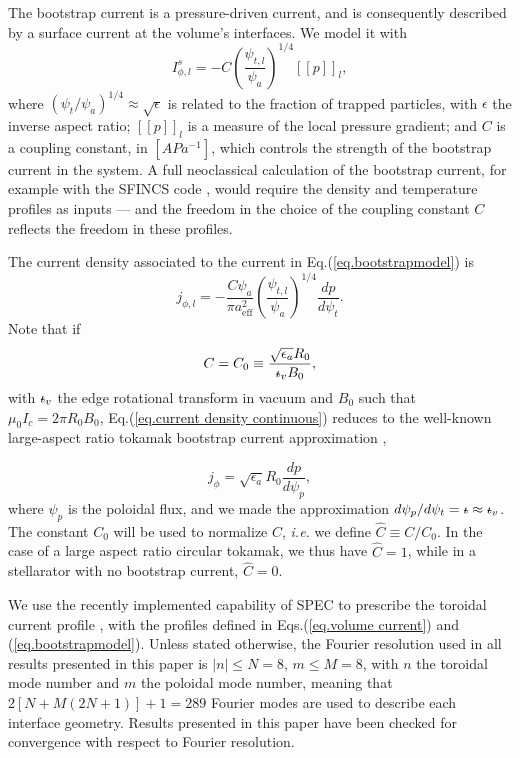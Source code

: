 \documentclass[my_thesis.tex]{subfiles}
\begin{document}
The bootstrap current is a pressure-driven current, and is consequently described by a surface current at the volume's interfaces. We model it with
\begin{equation}
	I^s_{\phi,l} = -C \left(\frac{\psi_{t,l}}{\psi_a}\right)^{1/4} \left[\left[p\right]\right]_l, \label{eq.bootstrapmodel}
\end{equation}
where $(\psi_t / \psi_a)^{1/4}\approx\sqrt{\epsilon}$ is related to the fraction of trapped particles, with $\epsilon$ the inverse aspect ratio; $[[p]]_l$ is a measure of the local pressure gradient; and $C$ is a coupling constant, in $[APa^{-1}]$, which controls the strength of the bootstrap current in the system. 
A full neoclassical calculation of the bootstrap current, for example with the SFINCS code \citep{landremanComparisonParticleTrajectories2014}, would require the density and temperature profiles as inputs --- and the freedom in the choice of the coupling constant $C$ reflects the freedom in these profiles. 

	

The current density associated to the current in Eq.(\ref{eq.bootstrapmodel}) is
\begin{equation}
	j_{\phi,l} = -\frac{C\psi_a}{\pi a_{\text{eff}}^2}\left(\frac{\psi_{t,l}}{\psi_a}\right)^{1/4}\frac{dp}{d\psi_t}. \label{eq.current density continuous}
\end{equation}	
Note that if 
\begin{equation}
	C = C_0 \equiv \frac{\sqrt{\epsilon_a}R_0}{\text{$\iota\!\!$-}_v B_0}, \label{eq. def C0}
\end{equation}
with $\text{$\iota\!\!$-}_v$ the edge rotational transform in vacuum and $B_0$ such that $\mu_0I_c= 2\pi R_0 B_0$, Eq.(\ref{eq.current density continuous}) reduces to the well-known large-aspect ratio tokamak bootstrap current approximation \citep{helanderCollisionalTransportMagnetized2002},
	
\begin{equation}
	j_{\phi} = \sqrt{\epsilon_a}R_0\frac{d p}{d\psi_p},
\end{equation}
where $\psi_p$ is the poloidal flux, and we made the approximation $d\psi_p/d\psi_t=\text{$\iota\!\!$-}\approx\text{$\iota\!\!$-}_v$. The constant $C_0$ will be used to normalize $C$, \textit{i.e.} we define $\hat{C}\equiv C / C_0$. In the case of a large aspect ratio circular tokamak, we thus have $\hat C = 1$, while in a stellarator with no bootstrap current, $\hat C=0$.
	
We use the recently implemented capability of SPEC to prescribe the toroidal current profile \citep{Baillod2021}, with the profiles defined in Eqs.(\ref{eq.volume current}) and (\ref{eq.bootstrapmodel}).
Unless stated otherwise, the Fourier resolution used in all results presented in this paper is $|n|\leq N=8$, $m\leq M=8$, with $n$ the toroidal mode number and $m$ the poloidal mode number, meaning that $2[N+M(2N+1)]+1=289$ Fourier modes are used to describe each interface geometry. Results presented in this paper have been checked for convergence with respect to Fourier resolution. 
\end{document}
